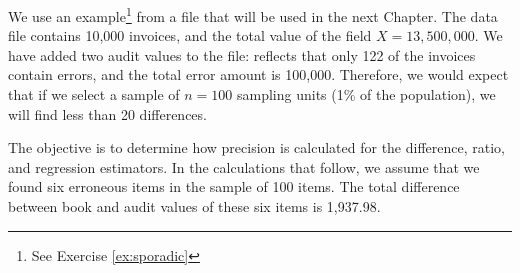 We use an example\footnote{See Exercise \ref{ex:sporadic}} from a file that will be used in the next Chapter. The  data file contains 10,000 invoices, and the total value of the  field $X = 13,500,000$. We have added two audit values to the file:  reflects that only 122 of the invoices contain errors, and the total error amount is 100,000. Therefore, we would expect that if we select a sample of $n = 100$ sampling units (1\% of the population), we will find less than 20 differences. 

The objective is to determine how precision is calculated for the difference, ratio, and regression estimators. In the calculations that follow, we assume that we found six erroneous items in the sample of 100 items. The total difference between book and audit values of these six items is 1,937.98.

